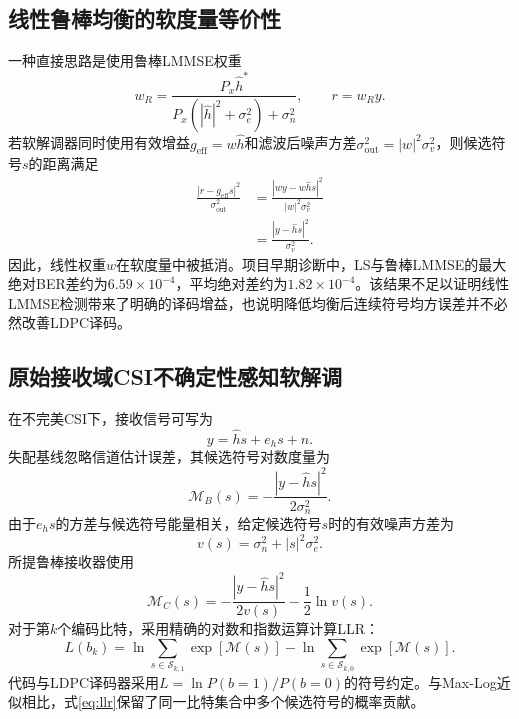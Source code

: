 \documentclass[UTF8,a4paper,11pt]{ctexart}
\newcommand{\CSI}{CSI}
\newcommand{\BER}{BER}
\newcommand{\LLR}{LLR}
\newcommand{\LDPC}{LDPC}
\begin{document}
\subsection{线性鲁棒均衡的软度量等价性}
一种直接思路是使用鲁棒LMMSE权重
\begin{equation}
  w_R=\frac{P_x\hat h^{*}}
  {P_x\left(|\hat h|^2+\sigma_e^2\right)+\sigma_n^2},
  \qquad
  r=w_Ry.
  \label{eq:robust_lmmse}
\end{equation}
若软解调器同时使用有效增益$g_{\mathrm{eff}}=w\hat h$和滤波后噪声方差$\sigma_{\mathrm{out}}^2=|w|^2\sigma_v^2$，则候选符号$s$的距离满足
\begin{align}
  \frac{|r-g_{\mathrm{eff}}s|^2}{\sigma_{\mathrm{out}}^2}
  &=\frac{|wy-w\hat hs|^2}{|w|^2\sigma_v^2}
  \nonumber\\
  &=\frac{|y-\hat hs|^2}{\sigma_v^2}.
  \label{eq:weight_cancel}
\end{align}
因此，线性权重$w$在软度量中被抵消。项目早期诊断中，LS与鲁棒LMMSE的最大绝对\BER{}差约为$6.59\times10^{-4}$，平均绝对差约为$1.82\times10^{-4}$。该结果不足以证明线性LMMSE检测带来了明确的译码增益，也说明降低均衡后连续符号均方误差并不必然改善\LDPC{}译码。

\subsection{原始接收域CSI不确定性感知软解调}
在不完美\CSI{}下，接收信号可写为
\begin{equation}
  y=\hat hs+e_hs+n.
  \label{eq:raw_receive}
\end{equation}
失配基线忽略信道估计误差，其候选符号对数度量为
\begin{equation}
  \mathcal M_B(s)
  =-\frac{|y-\hat hs|^2}{2\sigma_n^2}.
  \label{eq:mismatched_metric}
\end{equation}
由于$e_hs$的方差与候选符号能量相关，给定候选符号$s$时的有效噪声方差为
\begin{equation}
  v(s)=\sigma_n^2+|s|^2\sigma_e^2.
  \label{eq:candidate_variance}
\end{equation}
所提鲁棒接收器使用
\begin{equation}
  \mathcal M_C(s)
  =-\frac{|y-\hat hs|^2}{2v(s)}
  -\frac{1}{2}\ln v(s).
  \label{eq:robust_metric}
\end{equation}
对于第$k$个编码比特，采用精确的对数和指数运算计算\LLR{}：
\begin{equation}
  L(b_k)
  =\ln\!\sum_{s\in\mathcal S_{k,1}}\!\exp[\mathcal M(s)]
  -\ln\!\sum_{s\in\mathcal S_{k,0}}\!\exp[\mathcal M(s)].
  \label{eq:llr}
\end{equation}
代码与\LDPC{}译码器采用$L=\ln P(b=1)/P(b=0)$的符号约定。与Max-Log近似相比，式\eqref{eq:llr}保留了同一比特集合中多个候选符号的概率贡献。
\end{document}
